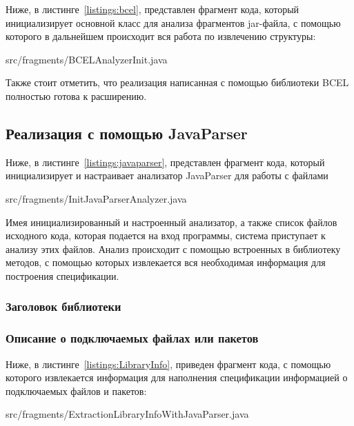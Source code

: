 Ниже, в листинге~\ref{listings:bcel}, представлен фрагмент кода, который инициализирует основной класс для анализа фрагментов jar-файла, с помощью которого в дальнейшем происходит вся работа по извлечению структуры:

{src/fragments/BCELAnalyzerInit.java}

Также стоит отметить, что реализация написанная с помощью библиотеки BCEL полностью готова к расширению.

\subsection{Реализация с помощью JavaParser}

Ниже, в листинге~\ref{listings:javaparser}, представлен фрагмент кода, который инициализирует и настраивает анализатор JavaParser для работы с файлами

{src/fragments/InitJavaParserAnalyzer.java}

Имея инициализированный и настроенный анализатор, а также список файлов исходного кода, которая подается на вход программы, система приступает к анализу этих файлов.
Анализ происходит с помощью встроенных в библиотеку методов, с помощью которых извлекается вся необходимая информация для построения спецификации.

\subsubsection{Заголовок библиотеки}

\subsubsection{Описание о подключаемых файлах или пакетов}

Ниже, в листинге~\ref{listings:LibraryInfo}, приведен фрагмент кода, с помощью которого извлекается информация для наполнения спецификации информацией о подключаемых файлов и пакетов:

{src/fragments/ExtractionLibraryInfoWithJavaParser.java}

